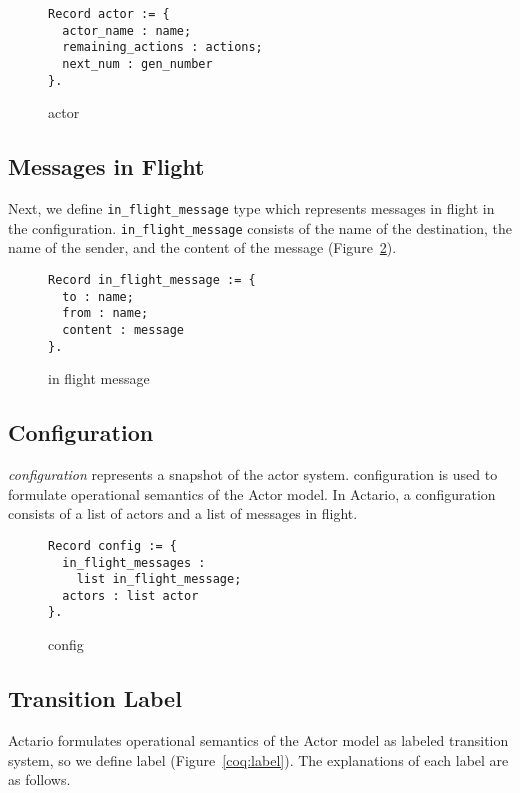 \begin{figure}[t]
\begin{lstlisting}
Record actor := {
  actor_name : name;
  remaining_actions : actions;
  next_num : gen_number
}.
\end{lstlisting}
\caption{actor}\label{coq:actor}
\end{figure}

\subsection{Messages in Flight}
Next, we define \lstinline|in_flight_message| type which represents messages in flight in the configuration.
\break\lstinline|in_flight_message| consists of the name of the destination, the name of the sender, and the content of the message (Figure~\ref{coq:inflight}).

\begin{figure}[t]
\begin{lstlisting}
Record in_flight_message := {
  to : name;
  from : name;
  content : message
}.
\end{lstlisting}
\caption{in flight message}\label{coq:inflight}
\end{figure}

\subsection{Configuration}
\textit{configuration} represents a snapshot of the actor system.
configuration is used to formulate operational semantics of the Actor model.
In Actario, a configuration consists of a list of actors and a list of messages in flight.

\begin{figure}[t]
\begin{lstlisting}
Record config := {
  in_flight_messages :
    list in_flight_message;
  actors : list actor
}.
\end{lstlisting}
\caption{config}\label{coq:config}
\end{figure}


\subsection{Transition Label}
Actario formulates operational semantics of the Actor model as labeled transition system, so we define label (Figure~\ref{coq:label}).
The explanations of each label are as follows.

